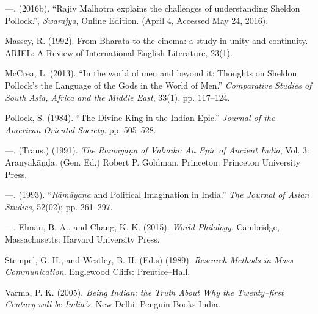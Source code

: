 \begin{thebibliography}{99}
  —. (2016b). “Rajiv Malhotra explains the challenges of understanding Sheldon Pollock.”, \textit{Swarajya}, Online Edition. (April 4, Accessed May 24, 2016).

  Massey, R. (1992). From Bharata to the cinema: a study in unity and continuity. ARIEL: A Review of International English Literature, 23(1).

  McCrea, L. (2013). “In the world of men and beyond it: Thoughts on Sheldon Pollock’s the Language of the Gods in the World of Men.” \textit{Comparative Studies of South Asia, Africa and the Middle East}, 33(1). pp. 117–124.

  Pollock, S. (1984). “The Divine King in the Indian Epic.” \textit{Journal of the American Oriental Society}. pp. 505–528.

  —. (Trans.) (1991). \textit{The Rāmāyaṇa of Vālmīki: An Epic of Ancient India}, Vol. 3: Araṇyakāṇḍa. (Gen. Ed.) Robert P. Goldman. Princeton: Princeton University Press.

  —. (1993). “\textit{Rāmāyaṇa} and Political Imagination in India.” \textit{The Journal of Asian Studies}, 52(02); pp. 261–297.

  —. Elman, B. A., and Chang, K. K. (2015). \textit{World Philology}. Cambridge, Massachusetts: Harvard University Press.

  Stempel, G. H., and Westley, B. H. (Ed.s) (1989). \textit{Research Methods in Mass Communication}. Englewood Cliffs: Prentice–Hall.

  Varma, P. K. (2005). \textit{Being Indian: the Truth About Why the Twenty–first Century will be India's}. New Delhi: Penguin Books India.

 \end{thebibliography}

\theendnotes

